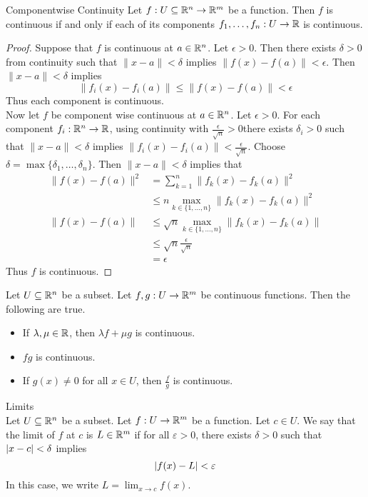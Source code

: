 \documentclass[a4paper]{article}
\begin{document}
\begin{thm}{Componentwise Continuity}{} Let $f:U\subseteq\mathbb{R}^n\to\mathbb{R}^m$ be a function. Then $f$ is continuous if and only if each of its components $f_1,\dots,f_n:U\to\mathbb{R}$ is continuous. 
\begin{proof}
Suppose that $f$ is continuous at $a\in\mathbb{R}^n$. Let $\epsilon>0$. Then there exists $\delta>0$ from continuity such that $\|x-a\|<\delta$ implies $\|f(x)-f(a)\|<\epsilon$. Then $\|x-a\|<\delta$ implies $$\|f_i(x)-f_i(a)\|\leq\|f(x)-f(a)\|<\epsilon$$ Thus each component is continuous. \\
Now let $f$ be component wise continuous at $a\in\mathbb{R}^n$. Let $\epsilon>0$. For each component $f_i:\mathbb{R}^n\to\mathbb{R}$, using continuity with $\frac{\epsilon}{\sqrt{n}}>0$there exists $\delta_i>0$ such that $\|x-a\|<\delta$ implies $\|f_i(x)-f_i(a)\|<\frac{\epsilon}{\sqrt{n}}$. Choose $\delta=\max\{\delta_1,\dots,\delta_n\}$. Then $\|x-a\|<\delta$ implies that 
\begin{align*}
\|f(x)-f(a)\|^2&=\sum_{k=1}^n\|f_k(x)-f_k(a)\|^2\\
&\leq n\max_{k\in\{1,\dots,n\}}\|f_k(x)-f_k(a)\|^2\\
\|f(x)-f(a)\|&\leq\sqrt{n}\max_{k\in\{1,\dots,n\}}\|f_k(x)-f_k(a)\|\\
&\leq\sqrt{n}\frac{\epsilon}{\sqrt{n}}\\
&=\epsilon
\end{align*}
Thus $f$ is continuous. 
\end{proof}
\end{thm}

\begin{prp}{}{} Let $U\subseteq\mathbb{R}^n$ be a subset. Let $f,g:U\to\mathbb{R}^m$ be continuous functions. Then the following are true. 
\begin{itemize}
\item If $\lambda,\mu\in\mathbb{R}$, then $\lambda f+\mu g$ is continuous. 
\item $fg$ is continuous. 
\item If $g(x)\neq 0$ for all $x\in U$, then $\frac{f}{g}$ is continuous. 
\end{itemize}
\end{prp}

\begin{defn}{Limits}{}\\
Let $U\subseteq\mathbb{R}^n$ be a subset. Let $f:U\to\mathbb{R}^m$ be a function. Let $c\in U$. We say that the limit of $f$ at $c$ is $L\in\mathbb{R}^m$ if for all $\varepsilon>0$, there exists $\delta>0$ such that $\abs{x-c}<\delta$ implies $$\abs{f(x)-L}<\varepsilon$$ In this case, we write $L=\lim_{x\to c}f(x)$. 
\end{defn}
\end{document}
